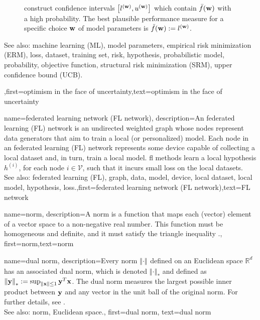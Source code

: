 {{\begin{figure}[H]
\begin{center}
{	construct confidence intervals $\big[ l^{({\bf w})},  u^{({\bf w})} \big]$ which contain $\bar{f}({\bf w})$  
	with a high probability. The best plausible performance measure for a specific choice ${\bf w}$ of model parameters 
	is $\tilde{f}({\bf w}) := l^{({\bf w})}$.} 
	\end{center}
		\end{figure}
		See also: machine learning (ML), model parameters, empirical risk minimization (ERM), loss, dataset, training set, risk, hypothesis, probabilistic model, probability, objective function, structural risk minimization (SRM), upper confidence bound (UCB).},first={optimism in the face of uncertainty},text={optimism in the face of uncertainty} 
}

{name={federated learning network (FL network)},
	description={An federated learning (FL) network is an 
		undirected weighted graph whose nodes represent data generators that 
		aim to train a local (or personalized) model. Each node in an federated learning (FL) network 
		represents some device capable of collecting a local dataset 
		and, in turn, train a local model. \Gls{fl} methods learn a local hypothesis $h^{(i)}$, for 
	    each node $i \in \mathcal{V}$, such that it incurs small loss on the local datasets.
	    			\\ 
		See also: federated learning (FL), graph, data, model, device, local dataset, local model, hypothesis, loss.},first={federated learning network (FL network)},text={FL network} 
}

{name={norm},
	description={A norm is a function that maps each (vector) element 
		of a vector space to a non-negative real number. This function must be 
		homogeneous and definite, and it must satisfy the triangle inequality \cite{HornMatAnalysis}.},
	first={norm},text={norm} 
}

{name={dual norm},
description={Every norm $\left\Vert  {\cdot} \right\Vert_{}$ defined on an Euclidean space $\mathbb{R}^{d}$ 
		has an associated dual norm, which is denoted $\left\Vert  {\cdot} \right\Vert_{*}$ and defined as 
		$\left\Vert  {{\bf y}} \right\Vert_{*} := \sup_{\Vert  {{\bf x}} \Vert{} \le 1} {\bf y}^{T} {\bf x}$. 
		The dual norm measures the largest possible inner product between ${\bf y}$ 
		and any vector in the unit ball of the original norm. For further details, see 
		\cite[Sec.~A.1.6]{BoydConvexBook}.
					\\ 
		See also: norm, Euclidean space.},
	first={dual norm},
	text={dual norm}
}

